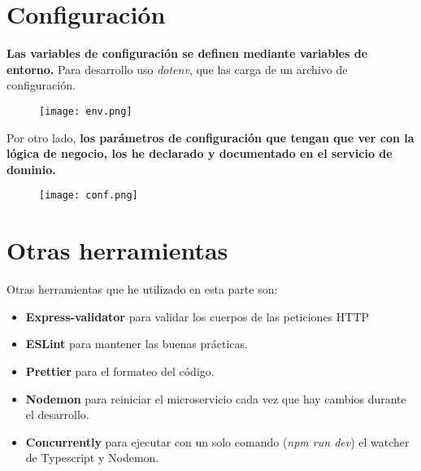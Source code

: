 \section{Configuración}\label{sec:config}
\textbf{Las variables de configuración se definen mediante variables de entorno.} Para desarrollo uso \textit{dotenv}, 
que las carga de un archivo de configuración.
\begin{figure}[H]
	\centering	
	\texttt{[image: env.png]}
	\end{figure}

	Por otro lado, \textbf{los parámetros de configuración que tengan que ver con la lógica
	de negocio, los he declarado y documentado en el servicio de dominio.}

\begin{figure}[H]
	\centering	
	\texttt{[image: conf.png]}
	\end{figure}



\section{Otras herramientas}\label{sec:tools}
Otras herramientas que he utilizado en esta parte son:
\begin{itemize}
	\item \textbf{Express-validator} para validar los cuerpos de las peticiones HTTP
	\item \textbf{ESLint} para mantener las buenas prácticas.
	\item \textbf{Prettier} para el formateo del código.
	\item \textbf{Nodemon} para reiniciar el microservicio cada vez que hay cambios durante el desarrollo.
	\item \textbf{Concurrently} para ejecutar con un solo comando (\textit{npm run dev}) el watcher de Typescript y Nodemon.
\end{itemize}